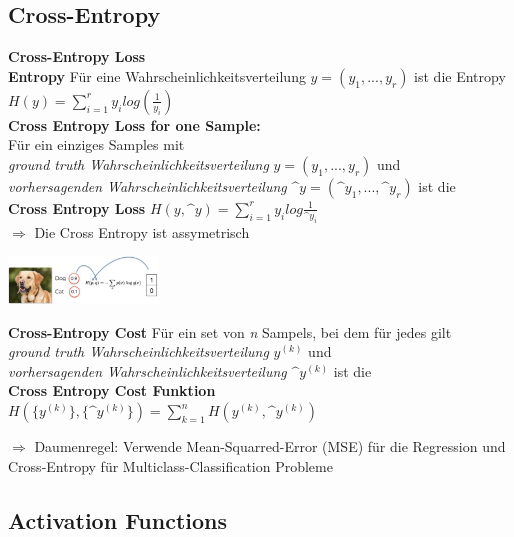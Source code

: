 \documentclass{article}
\newenvironment{Figure}
	{\par\medskip\noindent\minipage{\linewidth}}
	{\endminipage\par\medskip}
\theoremstyle{merke}
\theoremstyle{definition}
\begin{document}
        \subsection{Cross-Entropy}
        \textbf{Cross-Entropy Loss}\\
        \textbf{Entropy} Für eine Wahrscheinlichkeitsverteilung $y = (y_1, ..., y_r)$ ist die Entropy $H(y) = \sum^r_{i=1} y_i log(\frac{1}{y_i})$\\
        \textbf{Cross Entropy Loss for one Sample:}\\
        Für ein einziges Samples mit \\ 
        \textit{ground truth Wahrscheinlichkeitsverteilung} $y = (y_1, ..., y_r)$ und \\
        \textit{vorhersagenden Wahrscheinlichkeitsverteilung} $\^y = (\^y_1, ..., \^y_r)$ ist die \\
        \textbf{Cross Entropy Loss} $H(y, \^y) = \sum^r_{i=1} y_i log \frac{1}{\^y_i}$\\
        $\Rightarrow$ Die Cross Entropy ist assymetrisch
        \begin{Figure}
        \centering
        \includegraphics[width=150px]{img/CrossEntropyLoss.png}
            \label{fig:Abbildung Cross Entropy Loss}
        \end{Figure}

        \textbf{Cross-Entropy Cost}
        Für ein set von \textit{n} Sampels, bei dem für jedes gilt\\
        \textit{ground truth Wahrscheinlichkeitsverteilung} $y^{(k)}$ und \\
        \textit{vorhersagenden Wahrscheinlichkeitsverteilung} $\^y^{(k)}$ ist die \\
        \textbf{Cross Entropy Cost Funktion} $H(\{y^{(k)}\}, \{ \^y^{(k)} \}) = \sum^n_{k=1} H(y^{(k)}, \^y^{(k)})$

        $\Rightarrow$ Daumenregel: Verwende Mean-Squarred-Error (MSE) für die Regression und Cross-Entropy für Multiclass-Classification Probleme


        \subsection{Activation Functions}
\end{document}
